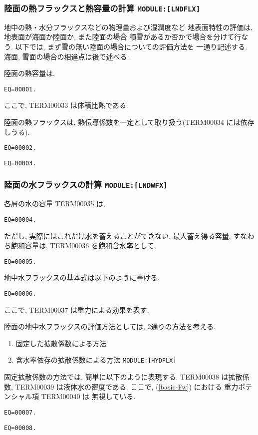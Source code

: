 \subsubsection{陸面の熱フラックスと熱容量の計算 \texttt{MODULE:[LNDFLX]}}

地中の熱・水分フラックスなどの物理量および湿潤度など
地表面特性の評価は, 地表面が海面か陸面か, また陸面の場合
積雪があるか否かで場合を分けて行なう. 
以下では, まず雪の無い陸面の場合についての評価方法を
一通り記述する. 海面, 雪面の場合の相違点は後で述べる. 

陸面の熱容量は,
\begin{verbatim}
EQ=00001.
\end{verbatim}
ここで, TERM00033 は体積比熱である.

陸面の熱フラックスは, 熱伝導係数を一定として取り扱う(TERM00034 には依存しうる).
\begin{verbatim}
EQ=00002.
\end{verbatim}
\begin{verbatim}
EQ=00003.
\end{verbatim}

\subsubsection{陸面の水フラックスの計算 \texttt{MODULE:[LNDWFX]}}

各層の水の容量 TERM00035 は, 
\begin{verbatim}
EQ=00004.
\end{verbatim}
ただし, 実際にはこれだけ水を蓄えることができない.
最大蓄え得る容量, すなわち飽和容量は, TERM00036 を飽和含水率として,
\begin{verbatim}
EQ=00005.
\end{verbatim}

地中水フラックスの基本式は以下のように書ける. 
\begin{verbatim}
EQ=00006.
\end{verbatim}
ここで, TERM00037 は重力による効果を表す. 

陸面の地中水フラックスの評価方法としては, 2通りの方法を考える.
\begin{enumerate}
\item 固定した拡散係数による方法
\item 含水率依存の拡散係数による方法 \texttt{MODULE:[HYDFLX]}
\end{enumerate}

固定拡散係数の方法では, 簡単に以下のように表現する.
TERM00038 は拡散係数, TERM00039 は液体水の密度である.
ここで, (\ref{basic-Fw}) における 重力ポテンシャル項 TERM00040 は
無視している. 
\begin{verbatim}
EQ=00007.
\end{verbatim}
\begin{verbatim}
EQ=00008.
\end{verbatim}


